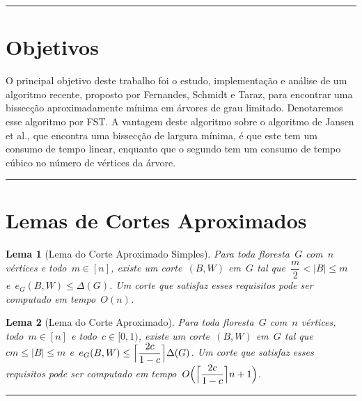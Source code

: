 \documentclass[a0,portrait]{a0poster}
\DeclarePairedDelimiter\ceil{\lceil}{\rceil}
\newtheorem{lem}{Lema}
\begin{document}
\begin{multicols}{3}
\noindent\rule[0.5ex]{\linewidth}{1pt}



\color{Black} %

\section*{Objetivos}
O principal objetivo deste trabalho foi o estudo, implementação e 
análise de um algoritmo recente, proposto por Fernandes, Schmidt e 
Taraz, para encontrar uma bissecção 
aproximadamente mínima em árvores de grau limitado. Denotaremos
esse algoritmo por FST. 
A vantagem deste algoritmo sobre o algoritmo de Jansen et 
al., que encontra uma bissecção de largura 
mínima, é que este tem um consumo de tempo linear, enquanto que o 
segundo tem um consumo de tempo cúbico no número de vértices da 
árvore. 

\noindent\rule[0.5ex]{\linewidth}{1pt}


\section* {Lemas de Cortes Aproximados}
\begin{lem}[Lema do Corte Aproximado Simples]
	Para toda floresta~$G$ com~$n$ vértices e todo~${m \in [n]}$,
	existe um corte~$(B,W)$ em~$G$ tal 
	que~${\dfrac{m}{2} <|B| \le m}$ e~${e_G(B,W) \le \Delta(G)}$.
	Um corte que satisfaz esses requisitos pode ser computado em
	tempo~$O(n)$.
\end{lem}

\medskip

\begin{lem}[Lema do Corte Aproximado]
	Para toda floresta~$G$ com~$n$ vértices, todo~${m \in [n]}$ e 
	todo~${c \in [0,1)}$, existe um corte~$(B,W)$ em~$G$ tal 
	que~${cm \le |B| \le m}$ 
	e~${e_G(B,W) \le \ceil[\Big]{ \dfrac{2c}{1-c}} \Delta(G)}$.
	Um corte que satisfaz esses requisitos pode ser computado em
	tempo~$O{\Big(\ceil[\Big]{ \dfrac{2c}{1-c}} n+1\Big)}$.
\end{lem}

\noindent\rule[0.5ex]{\linewidth}{1pt}



\end{multicols}
\end{document}
